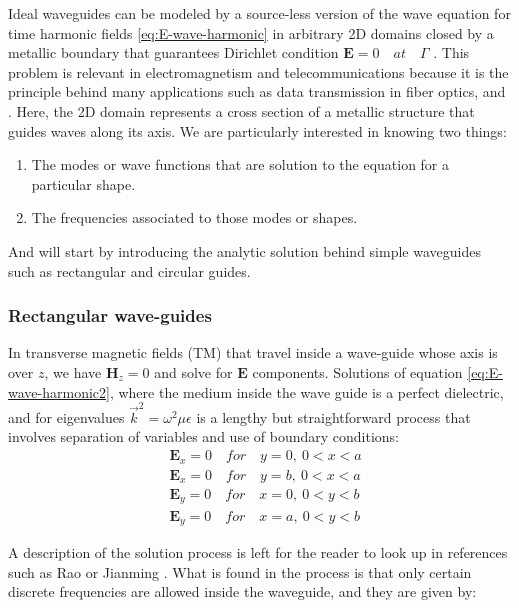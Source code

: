 Ideal wave\remove[SEC]{-}guides can be modeled by a source-less version of the wave equation for time harmonic fields \ref{eq:E-wave-harmonic} in arbitrary 2D domains closed by a metallic  boundary that guarantees Dirichlet condition $\mathbf{E} = 0\quad at\quad \Gamma$ . This problem is relevant in electromagnetism and telecommunications because it is the principle behind many applications such as data transmission in fiber optics, and . Here, the 2D domain represents a cross section of a metallic structure that guides waves along its axis. We are particularly interested in knowing two things:
\begin{enumerate}
\item The modes or wave functions that are solution to the equation for a particular shape.
\item The frequencies associated to those modes or shapes. 
\end{enumerate}
And will start by introducing the analytic solution behind simple wave\remove[SEC]{-}guides such as rectangular and circular guides.

\subsubsection{Rectangular wave-guides} 

In transverse magnetic fields (TM) that travel inside a wave-guide whose axis is over $z$, we have $\mathbf{H}_z = 0$ and solve for $\mathbf{E}$ components. 
Solutions of equation \ref{eq:E-wave-harmonic2}, where the medium inside the wave guide is a perfect dielectric, and  for eigenvalues $\vec{k}^2 = \omega^2\mu\epsilon$ is a lengthy but straightforward process that involves separation of variables and use of boundary conditions:
\begin{align}
&\mathbf{E}_x = 0 \quad for \quad y=0,\ 0<x<a\\
&\mathbf{E}_x = 0 \quad for \quad y=b,\ 0<x<a\\
&\mathbf{E}_y = 0 \quad for \quad x=0,\ 0<y<b\\
&\mathbf{E}_y = 0 \quad for \quad x=a,\ 0<y<b
\label{eq:square_bc}
\end{align}

A description of the solution process is left for the reader to look up in references such as Rao  \cite{Rao2004} or Jianming \cite{Jin2010}. What is found in the process is that only certain discrete frequencies are allowed inside the wave\remove[SEC]{-}guide, and they are given by:

